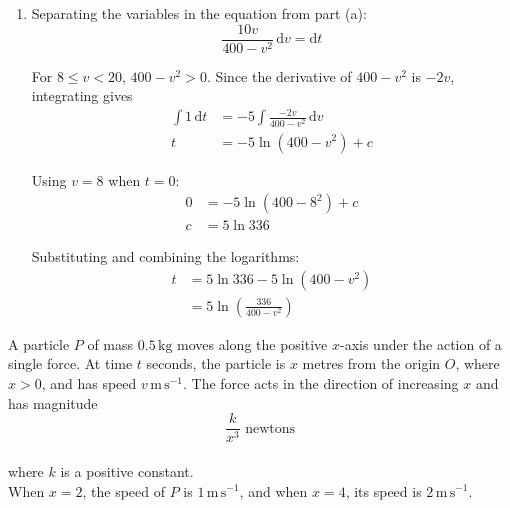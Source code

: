 \documentclass[leqno]{article}
\begin{document}
\begin{enumerate}[
  label=\textbf{\arabic*.},
  leftmargin=*,
  topsep=0pt,
  partopsep=0pt,
  parsep=0pt
]
\begin{djsSolution}
\begin{enumerate}[label=\textbf{(\alph*)}, start=1]
  Using Newton's second law, with acceleration \(a=\frac{\mathrm{d}v}{\mathrm{d}t}\):
  \[
  2000\frac{\mathrm{d}v}{\mathrm{d}t}=\frac{80\,000}{v}-200v
  \]

  Multiplying by \(\frac{v}{200}\):
  \[
  10v\frac{\mathrm{d}v}{\mathrm{d}t}=400-v^2
  \]

  \item Separating the variables in the equation from part (a):
  \[
  \frac{10v}{400-v^2}\,\mathrm{d}v=\mathrm{d}t
  \]

  For \(8\leq v<20\), \(400-v^2>0\). Since the derivative of \(400-v^2\) is \(-2v\), integrating gives
  \begin{align*}
  \int 1\,\mathrm{d}t&=-5\int\frac{-2v}{400-v^2}\,\mathrm{d}v\\
  t&=-5\ln(400-v^2)+c
  \end{align*}

  Using \(v=8\) when \(t=0\):
  \begin{align*}
  0&=-5\ln(400-8^2)+c\\
  c&=5\ln336
  \end{align*}

  Substituting and combining the logarithms:
  \begin{align*}
  t&=5\ln336-5\ln(400-v^2)\\
  &=5\ln\left(\frac{336}{400-v^2}\right)
  \end{align*}
\end{enumerate}
\end{djsSolution}

\newpage

\questionitem

A particle $P$ of mass $0.5\,\mathrm{kg}$ moves along the positive $x$-axis under the action of a single force. At time $t$ seconds, the particle is $x$ metres from the origin $O$, where $x>0$, and has speed $v\,\mathrm{m\,s^{-1}}$. The force acts in the direction of increasing $x$ and has magnitude
\[
\frac{k}{x^3}\text{ newtons}
\] \\
where $k$ is a positive constant. \\

When $x=2$, the speed of $P$ is $1\,\mathrm{m\,s^{-1}}$, and when $x=4$, its speed is $2\,\mathrm{m\,s^{-1}}$. \\


\end{enumerate}
\end{document}
